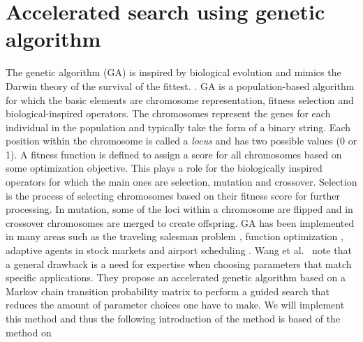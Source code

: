 \section{Accelerated search using genetic algorithm}\label{sec:GA}
The genetic algorithm (\acrshort{GA}) is inspired by biological evolution and mimics the Darwin theory of the survival of the fittest.
\cite{katoch_review_2021}. \acrshort{GA} is a population-based algorithm for
which the basic elements are chromosome representation, fitness selection and
biological-inspired operators. The chromosomes represent the genes for each
individual in the population and typically take the form of a binary string.
Each position within the chromosome is called a \textit{locus} and has two
possible values (0 or 1). A fitness function is defined to assign a score for
all chromosomes based on some optimization objective. This plays a role for the
biologically inspired operators for which the main ones are selection, mutation
and crossover. Selection is the process of selecting chromosomes based on their
fitness score for further processing. In mutation, some of the loci within a
chromosome are flipped and in crossover chromosomes are merged to create
offspring. \acrshort{GA} has been implemented in many areas such as the traveling salesman problem \cite{jiang2000distributed}, function optimization \cite{szeto1998effects}, adaptive agents in stock markets \cite{szeto2000adaptive} and airport scheduling \cite{shiu2008self}. Wang et al.\ \cite{Wang2010} note that a general drawback is a need for expertise when choosing parameters that match specific applications. They propose an accelerated genetic algorithm based on a Markov chain transition probability matrix to perform a guided search that reduces the amount of parameter choices one have to make. We will implement this method and thus the following introduction of the method  is based of the method on \cite{Wang2010}

